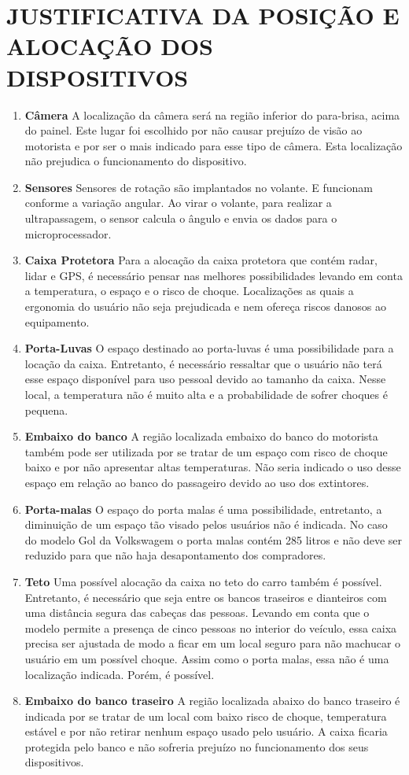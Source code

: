 \chapter[JUSTIFICATIVA DA POSIÇÃO E ALOCAÇÃO DOS DISPOSITIVOS]{JUSTIFICATIVA DA POSIÇÃO E ALOCAÇÃO DOS DISPOSITIVOS}
\begin{enumerate}
\item \textbf{Câmera}
A localização da câmera será na região inferior do para-brisa, acima do painel. Este lugar foi escolhido por não causar prejuízo de visão ao motorista e por ser o mais indicado para esse tipo de câmera. Esta localização não prejudica o funcionamento do dispositivo.
\item \textbf{Sensores}
Sensores de rotação são implantados no volante. E funcionam conforme a variação angular. Ao virar o volante, para realizar a ultrapassagem, o sensor calcula o ângulo e envia os dados para o microprocessador.
\item \textbf{Caixa Protetora}
Para a alocação da caixa protetora que contém radar, lidar e GPS, é necessário pensar nas melhores possibilidades levando em conta a temperatura, o espaço e o risco de choque. Localizações as quais a ergonomia do usuário não seja prejudicada e nem ofereça riscos danosos ao equipamento.
\item \textbf{Porta-Luvas}
O espaço destinado ao porta-luvas é uma possibilidade para a locação da caixa. Entretanto, é necessário ressaltar que o usuário não terá esse espaço disponível para uso pessoal devido ao tamanho da caixa. Nesse local, a temperatura não é muito alta e a probabilidade de sofrer choques é pequena.
\item \textbf{Embaixo do banco}
A região localizada embaixo do banco do motorista também pode ser utilizada por se tratar de um espaço com risco de choque baixo e por não apresentar altas temperaturas. Não seria indicado o uso desse espaço em relação ao banco do passageiro devido ao uso dos extintores.
\item \textbf{Porta-malas}
O espaço do porta malas é uma possibilidade, entretanto, a diminuição de um espaço tão visado pelos usuários não é indicada. No caso do modelo Gol da Volkswagem o porta malas contém 285 litros e não deve ser reduzido para que não haja desapontamento dos compradores.
\item \textbf{Teto}
Uma possível alocação da caixa no teto do carro também é possível. Entretanto, é necessário que seja entre os bancos traseiros e dianteiros com uma distância segura das cabeças das pessoas. Levando em conta que o modelo permite a presença de cinco pessoas no interior do veículo, essa caixa precisa ser ajustada de modo a ficar em um local seguro para não machucar o usuário em um possível choque. Assim como o porta malas, essa não é uma localização indicada. Porém, é possível.
\item \textbf{Embaixo do banco traseiro}
A região localizada abaixo do banco traseiro é indicada por se tratar de um local com baixo risco de choque, temperatura estável e por não retirar nenhum espaço usado pelo usuário. A caixa ficaria protegida pelo banco e não sofreria prejuízo no funcionamento dos seus dispositivos.
\end{enumerate}
